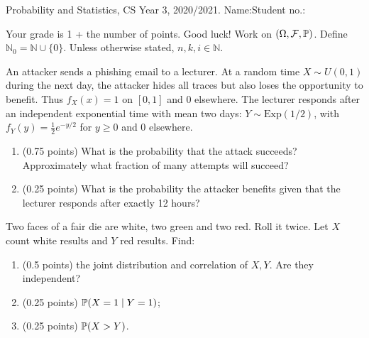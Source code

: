 \documentclass[a4paper]{report}
\newif\ifshowsolutions
\begin{document}
\noindent Probability and Statistics, CS Year 3, 2020/2021. Name:\hfill Student no.:\qquad\qquad
\hrulefill
\begin{it}Your grade is 1 + the number of points. Good luck! Work on $(\Omega,\mathcal F,\P)$. Define $\mathbb N_0=\mathbb N\cup\{0\}$. Unless otherwise stated, $n,k,i\in\mathbb N$.\end{it}
\begin{problem}
An attacker sends a phishing email to a lecturer. At a random time $X\sim U(0,1)$ during the next day, the attacker hides all traces but also loses the opportunity to benefit. Thus $f_X(x)=1$ on $[0,1]$ and 0 elsewhere. The lecturer responds after an independent exponential time with mean two days: $Y\sim\mathrm{Exp}(1/2)$, with $f_Y(y)=\frac12e^{-y/2}$ for $y\geq0$ and 0 elsewhere.
\begin{enumerate}
\item (0.75 points) What is the probability that the attack succeeds? Approximately what fraction of many attempts will succeed?
\ifshowsolutions
\par\textbf{Solution.} The desired probability is
\[p:=\P(X<Y)=\int_0^1\int_0^x\frac12e^{-y/2}\,dy\,dx,\]
which is easily calculated. By the law of large numbers, the successful fraction is $p$; specify the variables and verify the hypotheses.
\fi
\item (0.25 points) What is the probability the attacker benefits given that the lecturer responds after exactly 12 hours?
\ifshowsolutions
\par\textbf{Solution.} We seek $\P(Y<X\mid X=1/2)=\P(Y<1/2)$. The intention was to use a conditional density, but it is actually unnecessary.
\fi
\end{enumerate}
\end{problem}
\begin{problem}
Two faces of a fair die are white, two green and two red. Roll it twice. Let $X$ count white results and $Y$ red results. Find:
\begin{enumerate}
\item (0.5 points) the joint distribution and correlation of $X,Y$. Are they independent?
\item (0.25 points) $\P(X=1\mid Y=1)$;
\item (0.25 points) $\P(X>Y)$.
\end{enumerate}
\ifshowsolutions\par\textbf{Solution in the source:} ---\fi
\end{problem}
\end{document}
